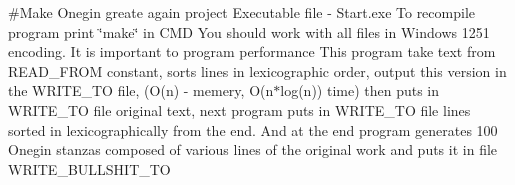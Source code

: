 \#\+Make Onegin greate again project 
 Executable file -\/ Start.\+exe To recompile program print \char`\"{}make\char`\"{} in CMD 
 You should work with all files in Windows 1251 encoding. It is important to program performance 
 This program take text from READ\+\_\+\+FROM constant, sorts lines in lexicographic order, output this version in the WRITE\+\_\+\+TO file, (O(n) -\/ memery, O(n$\ast$log(n)) time) then puts in WRITE\+\_\+\+TO file original text, next program puts in WRITE\+\_\+\+TO file lines sorted in lexicographically from the end. And at the end program generates 100 Onegin stanzas composed of various lines of the original work and puts it in file WRITE\+\_\+\+BULLSHIT\+\_\+\+TO 
